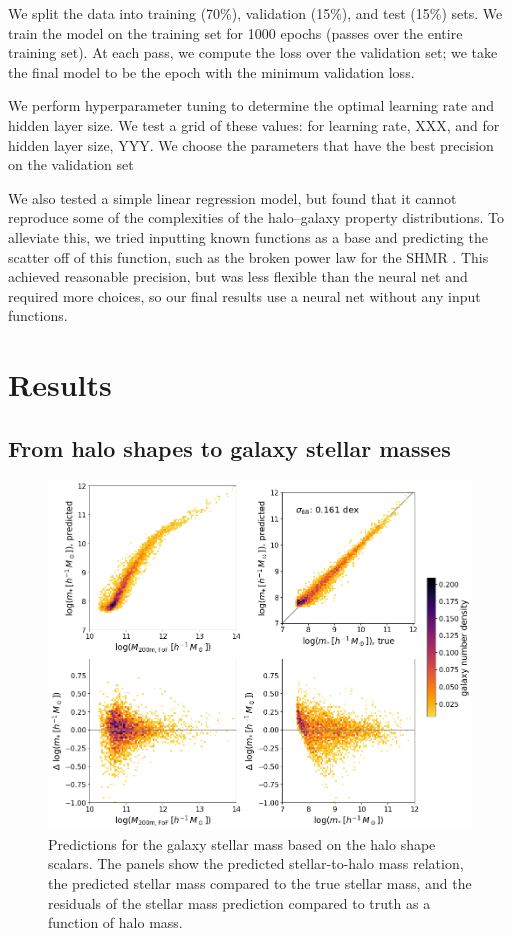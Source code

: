 We split the data into training (70\%), validation (15\%), and test (15\%) sets.
We train the model on the training set for 1000 epochs (passes over the entire training set).
At each pass, we compute the loss over the validation set; we take the final model to be the epoch with the minimum validation loss. 

We perform hyperparameter tuning to determine the optimal learning rate and hidden layer size.
We test a grid of these values: for learning rate, XXX, and for hidden layer size, YYY.
We choose the parameters that have the best precision on the validation set





We also tested a simple linear regression model, but found that it cannot reproduce some of the complexities of the halo--galaxy property distributions.
To alleviate this, we tried inputting known functions as a base and predicting the scatter off of this function, such as the broken power law for the SHMR \citep{}.
This achieved reasonable precision, but was less flexible than the neural net and required more choices, so our final results use a neural net without any input functions.

\section{Results}
\label{sec:results}

\subsection{From halo shapes to galaxy stellar masses}

\begin{figure}
    \centering
    \includegraphics[width=0.7\columnwidth]{pred_mstellar.png}
    \caption{Predictions for the galaxy stellar mass based on the halo shape scalars. The panels show the predicted stellar-to-halo mass relation, the predicted stellar mass compared to the true stellar mass, and the residuals of the stellar mass prediction compared to truth as a function of halo mass.}
    \label{fig:mstellar}
\end{figure}

